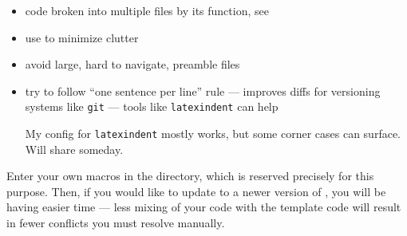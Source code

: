 \begin{itemize}
    \item code broken into multiple files by its function, see 
    \item use  to minimize clutter
    \item avoid large, hard to navigate, preamble files
    \item try to follow \enquote{one sentence per line} rule --- improves diffs for versioning systems like \texttt{git} --- tools like \texttt{latexindent} can help
          \begin{Note}
              My config for \texttt{latexindent} mostly works, but some corner cases can surface.
              Will share someday.
          \end{Note}
\end{itemize}

\begin{remark}
    Enter your own macros in the  directory, which is reserved precisely for this purpose.
    Then, if you would like to update to a newer version of \TeXtured{}, you will be having easier time --- less mixing of your code with the template code will result in fewer conflicts you must resolve manually.
\end{remark}

